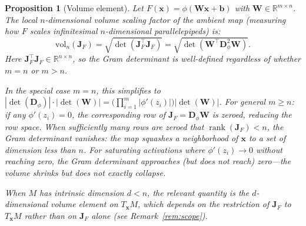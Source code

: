 \documentclass[11pt,a4paper]{article}
\newtheorem{proposition}[theorem]{Proposition}
\theoremstyle{remark}
\begin{document}
\begin{proposition}[Volume element]
\label{prop:volume}
Let $F(\mathbf{x}) = \phi(\mathbf{W}\mathbf{x} + \mathbf{b})$ with $\mathbf{W} \in \mathbb{R}^{m \times n}$.
The local $n$-dimensional volume scaling factor of the ambient map (measuring how $F$ scales infinitesimal $n$-dimensional parallelepipeds) is:
\begin{equation}
  \mathrm{vol}_n(\mathbf{J}_F) = \sqrt{\det(\mathbf{J}_F^\top \mathbf{J}_F)} = \sqrt{\det(\mathbf{W}^\top \mathbf{D}_\phi^2 \mathbf{W})}.
  \label{eq:volume}
\end{equation}
Here $\mathbf{J}_F^\top \mathbf{J}_F \in \mathbb{R}^{n \times n}$, so the Gram determinant is well-defined regardless of whether $m = n$ or $m > n$.

In the special case $m = n$, this simplifies to $|\det(\mathbf{D}_\phi)| \cdot |\det(\mathbf{W})| = \bigl(\prod_{i=1}^m |\phi'(z_i)|\bigr) |\det(\mathbf{W})|$.
For general $m \geq n$: if any $\phi'(z_i) = 0$, the corresponding row of $\mathbf{J}_F = \mathbf{D}_\phi \mathbf{W}$ is zeroed, reducing the row space.
When sufficiently many rows are zeroed that $\operatorname{rank}(\mathbf{J}_F) < n$, the Gram determinant vanishes: the map squashes a neighborhood of $\mathbf{x}$ to a set of dimension less than $n$.
For saturating activations where $\phi'(z_i) \to 0$ without reaching zero, the Gram determinant approaches (but does not reach) zero---the volume shrinks but does not exactly collapse.

When $M$ has intrinsic dimension $d < n$, the relevant quantity is the $d$-dimensional volume element on $T_{\mathbf{x}}M$, which depends on the restriction of $\mathbf{J}_F$ to $T_{\mathbf{x}}M$ rather than on $\mathbf{J}_F$ alone (see Remark~\ref{rem:scope}).
\end{proposition}
\end{document}
